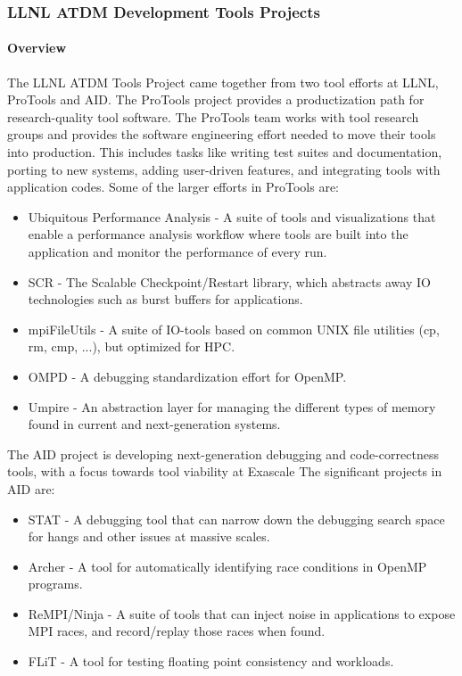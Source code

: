 \subsubsection{ LLNL ATDM Development Tools Projects}

\paragraph{Overview} The LLNL ATDM Tools Project came together from two tool efforts at LLNL, ProTools and AID.  The ProTools project provides a productization path for research-quality tool software.  The ProTools team works with tool research groups and provides the software engineering effort needed to move their tools into production.  This includes tasks like writing test suites and documentation, porting to new systems, adding user-driven features, and integrating tools with application codes.  Some of the larger efforts in ProTools are:

\begin{itemize}
\itemsep 0em 
\item Ubiquitous Performance Analysis - A suite of tools and visualizations that enable a performance analysis workflow where tools are built into the application and monitor the performance of every run.
\item SCR - The Scalable Checkpoint/Restart library, which abstracts away IO technologies such as burst buffers for applications.
\item mpiFileUtils - A suite of IO-tools based on common UNIX file utilities (cp, rm, cmp, ...), but optimized for HPC.
\item OMPD - A debugging standardization effort for OpenMP.
\item Umpire - An abstraction layer for managing the different types of memory found in current and next-generation systems.
\end{itemize}

The AID project is developing next-generation debugging and code-correctness tools, with a focus towards tool viability at Exascale  The significant projects in AID are:
\begin{itemize}
\itemsep 0em 
\item STAT - A debugging tool that can narrow down the debugging search space for hangs and other issues at massive scales.
\item Archer - A tool for automatically identifying race conditions in OpenMP programs.
\item ReMPI/Ninja - A suite of tools that can inject noise in applications to expose MPI races, and record/replay those races when found.
\item FLiT - A tool for testing floating point consistency and workloads.
\end{itemize}

